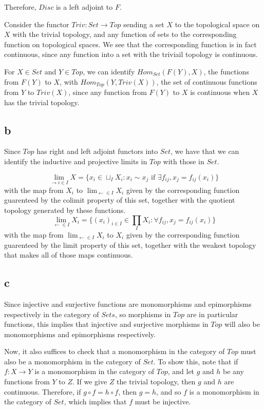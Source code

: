 \documentclass[a4paper]{article}
\theoremstyle{named}
\let\tempb\subsection
\renewcommand{\subsection}[1]{\tempb*{#1}}
\begin{document}
Therefore, $Disc$ is a left adjoint to $F$.

Consider the functor $Triv : Set \rightarrow Top$ sending a set $X$ to the topological space on $X$ with the trivial topology, and any function of sets to the corresponding function on topological spaces. We see that the corresponding function is in fact continuous, since any function into a set with the triviail topology is continuous.


For $X \in Set$ and $Y \in Top$, we can identify $Hom_{Set}(F(Y), X)$, the functions from $F(Y)$ to $X$, with $Hom_{Top}(Y, Triv(X))$, the set of continuous functions from $Y$ to $Triv(X)$, since any function from $F(Y)$ to $X$ is continuous when $X$ has the trivial topology.

\subsection{b}
Since $Top$ has right and left adjoint functors into $Set$, we have that we can identify the inductive and projective limits in $Top$ with those in $Set$.

\[
    \lim_{\rightarrow i \in I}X = \{x_i \in \sqcup_I X_i :x_i \sim x_j \text{ if } \exists f_{ij}, x_j = f_{ij}(x_i)\}
\]
with the map from $X_i$ to $\lim_{\leftarrow \in I}X_i$ given by the corresponding function guarenteed by the colimit property of this set, together with the quotient topology generated by these functions.
\[
    \lim_{\leftarrow \in I}X_i= \{(x_i)_{i\in I} \in \prod_I X_i : \forall f_{ij}, x_j = f_{ij}(x_i)\}
\]
with the map from $\lim_{\leftarrow \in I}X_i$ to $X_i$ given by the corresponding function guarenteed by the limit property of this set, together with the weakest topology that makes all of those maps continuous.

\subsection{c}
Since injective and surjective functions are monomorphisms and epimorphisms respectively in the category of $Sets$, so morphisms in  $Top$ are in particular functions, this implies that injective and surjective morphisms in $Top$ will also be monomorphisms and epimorphisms respectively.

Now, it also suffices to check that a monomorphism in the category of $Top$ must also be a monomorphism in the category of $Set$. To show this, note that if $f:X\rightarrow Y$ is a monomorphism in the category of $Top$, and let $g$ and $h$ be any functions from $Y$ to $Z$. If we give $Z$ the trivial topology, then $g$ and $h$ are continuous. Therefore, if $g \circ f = h \circ f$, then $g = h$, and so $f$ is a monomorphism in the category of $Set$, which implies that $f$ must be injective.
\end{document}
